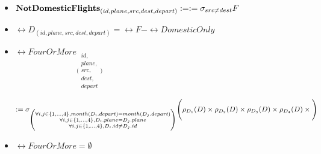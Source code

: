 \begin{enumerate}[label=]
\begin{itemize}[label=]
        \item $\textbf{NotDomesticFlights}_{(id, plane, src, dest, depart)} :=  := \sigma_{src \neq dest} F$

        \item $\rel{D}_{(id, plane, src, dest, depart)} = \rel{F} - \rel{DomesticOnly}$
        
        \item $\rel{FourOrMore}_{\Bigg( \substack{id,\\ plane,\\ src,\\ dest,\\ depart} \Bigg)}$
        
        $:= \sigma_{\Bigg(\substack{
        \forall i,j \in \{1,..., 4\}, month(D_i.depart) = month(D_j.depart)\\
        \forall i,j \in \{1,..., 4\}, D_i.plane = D_j.plane \\
        \forall i,j \in \{1,..., 4\}, D_i.id \neq D_j.id} \Bigg)} \Bigg( \rho_{D_1}(D) \times \rho_{D_2}(D) \times \rho_{D_3}(D) \times \rho_{D_4}(D) \times\Bigg)$ 

        \item $\rel{FourOrMore} = \emptyset$

        
    \end{itemize}
\end{enumerate}
    

